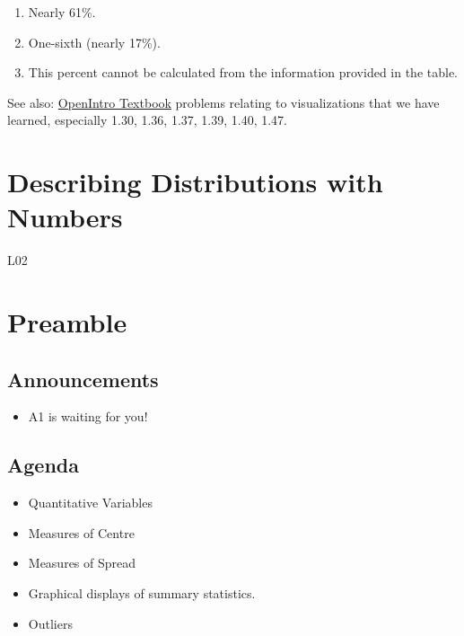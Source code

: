 \documentclass[
  letterpaper,
  DIV=11,
  numbers=noendperiod]{scrreprt}
\providecommand{\tightlist}{%
  \setlength{\itemsep}{0pt}\setlength{\parskip}{0pt}}\usepackage{longtable,booktabs,array}
\begin{document}
\begin{enumerate}
\def\labelenumi{\alph{enumi}.}
\tightlist
\item
  Nearly 61\%.
\item
  One-sixth (nearly 17\%).
\item
  This percent cannot be calculated from the information provided in the
  table.
\end{enumerate}

See also:
\href{https://stats.libretexts.org/Bookshelves/Introductory_Statistics/Book\%3A_OpenIntro_Statistics_(Diez_et_al)./01\%3A_Introduction_to_Data/1.E\%3A_Introduction_to_Data_(Exercises)}{OpenIntro
Textbook} problems relating to visualizations that we have learned,
especially 1.30, 1.36, 1.37, 1.39, 1.40, 1.47.

\hypertarget{describing-distributions-with-numbers}{%
\chapter{Describing Distributions with
Numbers}\label{describing-distributions-with-numbers}}

L02

\hfill\break

\hypertarget{preamble}{%
\chapter{Preamble}\label{preamble}}

\hypertarget{announcements-1}{%
\section{Announcements}\label{announcements-1}}

\begin{itemize}
\tightlist
\item
  A1 is waiting for you!
\end{itemize}

\hypertarget{agenda-1}{%
\section{Agenda}\label{agenda-1}}

\begin{itemize}
\tightlist
\item
  Quantitative Variables\lspace
\item
  Measures of Centre\lspace
\item
  Measures of Spread\lspace
\item
  Graphical displays of summary statistics.\lspace
\item
  Outliers
\end{itemize}
\end{document}
